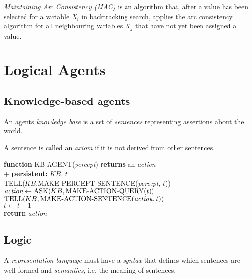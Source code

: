 \documentclass{article}
\begin{document}
\begin{definition}
    \emph{Maintaining Arc Consistency (MAC)} is an algorithm that, after a value has
    been selected for a variable $X_i$ in backtracking search, applies the arc
    consistency algorithm for all neighbouring variables $X_j$ that have not yet
    been assigned a value.
\end{definition}

\section{Logical Agents}

\subsection{Knowledge-based agents}

\begin{definition}
    An agents \emph{knowledge base} is a set of \emph{sentences} representing assertions
    about the world.
\end{definition}

\begin{definition}
    A sentence is called an \emph{axiom} if it is not derived from other sentences.
\end{definition}

\begin{pseudo}
    \textbf{function} KB-AGENT(\emph{percept}) \textbf{returns} an \emph{action} \\+
        \textbf{persistent:} $KB$, $t$\\
        TELL($KB$,MAKE-PERCEPT-SENTENCE(\emph{percept}, $t$))\\
        $\text{\emph{action}}\leftarrow\text{ASK}(KB,\text{MAKE-ACTION-QUERY}(t))$\\
        $\text{TELL}(KB, \text{MAKE-ACTION-SENTENCE}(\text{\emph{action}},t))$\\
        $t\leftarrow t+1$\\
        \textbf{return} \emph{action}
\end{pseudo}

\subsection{Logic}

\begin{definition}
    A \emph{representation language} must have a \emph{syntax} that defines which
    sentences are well formed and \emph{semantics}, i.e. the meaning of sentences.
\end{definition}
\end{document}
